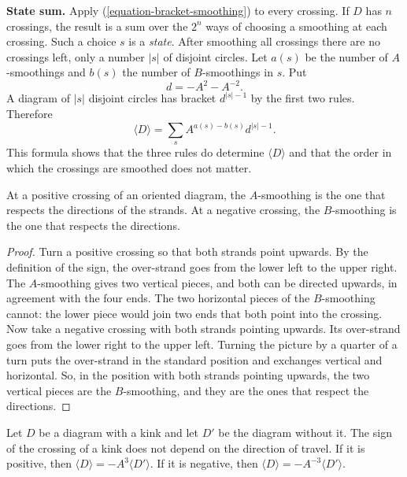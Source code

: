 \medskip\noindent
{\bf State sum.} Apply
(\ref{equation-bracket-smoothing}) to
every crossing. If $D$ has $n$
crossings, the result is a sum over the
$2^n$ ways of choosing a smoothing at
each crossing. Such a choice $s$ is a
{\it state}. After smoothing all
crossings there are no crossings left,
only a number $|s|$ of disjoint circles.
Let $a(s)$ be the number of
$A$-smoothings and $b(s)$ the number of
$B$-smoothings in $s$. Put
$$
d=-A^{2}-A^{-2}.
$$
A diagram of $|s|$ disjoint circles has
bracket $d^{|s|-1}$ by the first two
rules. Therefore
\begin{equation}
\label{equation-state-sum}
\langle D\rangle
=\sum_{s}A^{a(s)-b(s)}d^{|s|-1}.
\end{equation}
This formula shows that the three rules
do determine $\langle D\rangle$ and
that the order in which the crossings
are smoothed does not matter.

\begin{lemma}
\label{lemma-smoothing-sign}
At a positive crossing of an oriented
diagram, the $A$-smoothing is the one
that respects the directions of the
strands. At a negative crossing, the
$B$-smoothing is the one that respects
the directions.
\end{lemma}

\begin{proof}
Turn a positive crossing so that both
strands point upwards. By the
definition of the sign, the over-strand
goes from the lower left to the upper
right. The $A$-smoothing gives two
vertical pieces, and both can be
directed upwards, in agreement with the
four ends. The two horizontal pieces of
the $B$-smoothing cannot: the lower
piece would join two ends that both
point into the crossing. Now take a
negative crossing with both strands
pointing upwards. Its over-strand goes
from the lower right to the upper left.
Turning the picture by a quarter of a
turn puts the over-strand in the
standard position and exchanges
vertical and horizontal. So, in the
position with both strands pointing
upwards, the two vertical pieces are
the $B$-smoothing, and they are the
ones that respect the directions.
\end{proof}

\begin{lemma}
\label{lemma-bracket-kink}
Let $D$ be a diagram with a kink and
let $D'$ be the diagram without it. The
sign of the crossing of a kink does not
depend on the direction of travel. If
it is positive, then
$\langle D\rangle
=-A^{3}\langle D'\rangle$.
If it is negative, then
$\langle D\rangle
=-A^{-3}\langle D'\rangle$.
\end{lemma}

